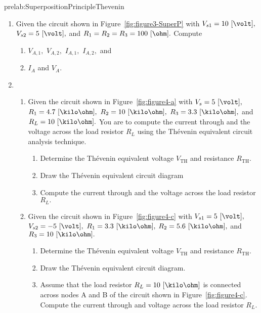  

\begin{prelab}{prelab:SuperpositionPrincipleThevenin}
\begin{enumerate}
    \item Given the circuit shown in Figure~\ref{fig:figure3-SuperP} with $V_{s1} = 10~[\volt],$  $V_{s2} = 5~[\volt],$  and $R_1 = R_2=R_3=100~[\ohm].$ Compute 
     \begin{enumerate}
         \item $V_{A,1},$ $V_{A,2},$ $I_{A,1},$ $I_{A,2},$ and 
         \item $I_A$ and $V_A.$
     \end{enumerate}
    \item 
    \begin{enumerate}
        \item Given the circuit shown in Figure~\ref{fig:figure4-a} with $V_s = 5~[\volt],$ $R_1 = 4.7~[\kilo\ohm],$ $R_2=10~[\kilo\ohm],$ $R_3 = 3.3~[\kilo\ohm],$ and $R_L = 10~[\kilo\ohm].$ You are to compute the current through and the voltage across the load resistor $R_L$ using the Th\'evenin equivalent circuit analysis technique.   
         \begin{enumerate}
             \item Determine the Th\'evenin equivalent voltage $V_{\mathrm{TH}}$ and resistance $R_{\mathrm{TH}}.$
             \item Draw the Th\'evenin equivalent circuit diagram
             \item Compute the current through and the voltage across the load resistor $R_L.$
         \end{enumerate}
     
     \item Given the circuit shown in Figure~\ref{fig:figure4-c} with $V_{s1} = 5~[\volt],$ $V_{s2} = -5~[\volt],$ $R_1 = 3.3~[\kilo\ohm],$ $R_2=5.6~[\kilo\ohm],$ and $R_3 = 10~[\kilo\ohm].$   
         \begin{enumerate}
             \item Determine the Th\'evenin equivalent voltage $V_{\mathrm{TH}}$ and resistance $R_{\mathrm{TH}}.$ %
             \item Draw the Th\'evenin equivalent circuit diagram.
               
             \item Assume that the load resistor $R_L = 10~[\kilo\ohm]$ is connected across nodes A and B of the circuit shown in Figure~\ref{fig:figure4-c}. Compute the current through and voltage across  the load resistor $R_L.$ 
         \end{enumerate}
    \end{enumerate}
\end{enumerate}
 
\end{prelab}


